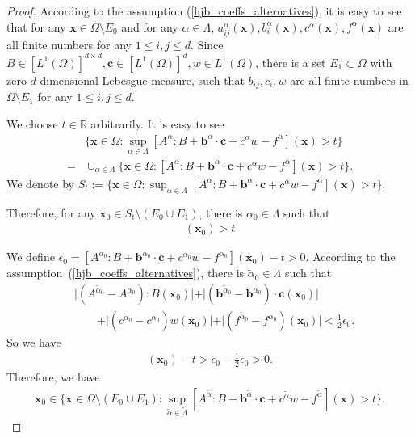 \documentclass[12pt]{amsart}
\newcommand{\boldx}{\boldsymbol{x}}
\theoremstyle{definition}
\theoremstyle{remark}
\begin{document}
\begin{proof}
According to the assumption (\ref{hjb_coeffs_alternatives}), it is easy to see 
that for any $\boldx \in \Omega \setminus E_{0}$ and for any $\alpha\in\Lambda$, 
$a_{ij}^{\alpha}(\boldx),b_{i}^{\alpha}(\boldx),c^{\alpha}(\boldx), 
f^{\alpha}(\boldx)$ are all finite numbers for any $1\leq i,j \leq d$. 
Since $B \in [L^{1}(\Omega)]^{d\times d}, \boldsymbol{c}\in 
[L^{1}(\Omega)]^{d}, w \in L^{1}(\Omega)$, there is a set 
$E_{1} \subset \Omega$ with zero $d$-dimensional Lebesgue measure, 
such that $b_{ij}, c_{i}, w$ are all finite numbers in $\Omega\setminus 
E_{1}$ for any $1\leq i,j \leq d$.

We choose $t \in \mathbb{R}$ arbitrarily. It is easy to see
\begin{align*}
& \{\boldx \in \Omega: \sup_{\alpha \in \Lambda} [A^{\alpha}:B 
+ \boldsymbol{b}^{\alpha}\cdot \boldsymbol{c} + c^{\alpha}w - f^{\alpha}]
(\boldx) > t \} \\
= & \cup_{\alpha \in \Lambda} \{ \boldx \in \Omega : 
[A^{\alpha}:B + \boldsymbol{b}^{\alpha}\cdot \boldsymbol{c} 
+ c^{\alpha}w - f^{\alpha}](\boldx) > t \}.
\end{align*}
We denote by $S_{t} := \{\boldx \in \Omega: \sup_{\alpha \in \Lambda} 
[A^{\alpha}:B + \boldsymbol{b}^{\alpha}\cdot \boldsymbol{c} 
+ c^{\alpha}w - f^{\alpha}](\boldx) > t \}$.

Therefore, for any $\boldx_{0} \in S_{t} \setminus (E_{0}\cup E_{1})$, there 
is $\alpha_{0} \in \Lambda$ such that 
\begin{align*}
[A^{\alpha_{0}}:B
+ \boldsymbol{b}^{\alpha_{0}}\cdot \boldsymbol{c}  
+ c^{\alpha_{0}}w - f^{\alpha_{0}}](\boldx_{0}) > t
\end{align*}

We define $\epsilon_{0} = [A^{\alpha_{0}}:B
+ \boldsymbol{b}^{\alpha_{0}}\cdot \boldsymbol{c}  
+ c^{\alpha_{0}}w - f^{\alpha_{0}}](\boldx_{0}) - t > 0$. 
According to the assumption~(\ref{hjb_coeffs_alternatives}), there is 
$\tilde{\alpha}_{0} \in \tilde{\Lambda}$ such that 
\begin{align*}
& \vert (A^{\tilde{\alpha}_{0}} - A^{\alpha_{0}}):B(\boldx_{0})\vert 
+ \vert (\boldsymbol{b}^{\tilde{\alpha}_{0}} - \boldsymbol{b}^{\alpha_{0}})
\cdot \boldsymbol{c} (\boldx_{0}) \vert \\ 
& \qquad + \vert (c^{\tilde{\alpha}_{0}}- c^{\alpha_{0}})
w(\boldx_{0}) \vert + \vert 
(f^{\tilde{\alpha}_{0}} - f^{\alpha_{0}})(\boldx_{0}) 
\vert <  \frac{1}{2}\epsilon_{0}.
\end{align*}
So we have 
\begin{align*}
[A^{\tilde{\alpha}_{0}}:B + \boldsymbol{b}^{\tilde{\alpha}_{0}}\cdot 
\boldsymbol{c} + c^{\tilde{\alpha}_{0}}w - f^{\tilde{\alpha}_{0}}](\boldx_{0}) - t 
> \epsilon_{0} - \frac{1}{2} \epsilon_{0} > 0.
\end{align*}
Therefore, we have 
\begin{align*}
\boldx_{0} \in \{ \boldx \in\Omega \setminus(E_{0}\cup E_{1}):\sup_{\tilde{\alpha}
\in \tilde{\Lambda}}
[A^{\tilde{\alpha}}:B + \boldsymbol{b}^{\tilde{\alpha}}\cdot\boldsymbol{c} 
+ c^{\tilde{\alpha}}w - f^{\tilde{\alpha}}](\boldx) > t \}.
\end{align*}


\end{proof}
\end{document}
